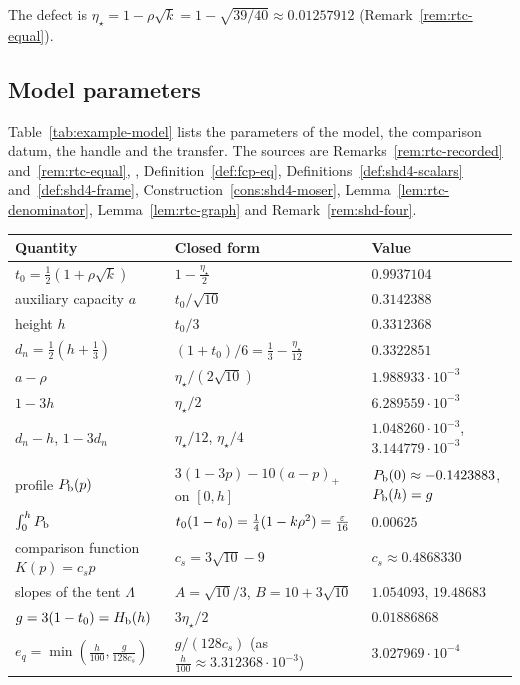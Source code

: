 The defect is $\eta_\star=1-\rho\sqrt k=1-\sqrt{39/40}\approx0.01257912$ (Remark~\ref{rem:rtc-equal}).

\subsection{Model parameters}

Table~\ref{tab:example-model} lists the parameters of the model, the comparison datum, the handle and the transfer. The
sources are Remarks~\ref{rem:rtc-recorded} and~\ref{rem:rtc-equal}, , Definition~\ref{def:fcp-eq},
Definitions~\ref{def:shd4-scalars} and~\ref{def:shd4-frame}, Construction~\ref{cons:shd4-moser},
Lemma~\ref{lem:rtc-denominator}, Lemma~\ref{lem:rtc-graph} and Remark~\ref{rem:shd-four}.

\begin{table}[ht]
\centering\footnotesize
\renewcommand{\arraystretch}{1.15}
\begin{tabular}{@{}p{}p{}p{}@{}}
\toprule
Quantity & Closed form & Value\\
\midrule
$t_0=\frac12(1+\rho\sqrt k)$ & $1-\frac{\eta_\star}2$ & $0.9937104$\\
auxiliary capacity $a$ & $t_0/\sqrt{10}$ & $0.3142388$\\
height $h$ & $t_0/3$ & $0.3312368$\\
$d_n=\frac12(h+\frac13)$ & $(1+t_0)/6=\frac13-\frac{\eta_\star}{12}$ & $0.3322851$\\
$a-\rho$ & $\eta_\star/(2\sqrt{10})$ & $1.988933\cdot10^{-3}$\\
$1-3h$ & $\eta_\star/2$ & $6.289559\cdot10^{-3}$\\
$d_n-h$, $1-3d_n$ & $\eta_\star/12$, $\eta_\star/4$ & $1.048260\cdot10^{-3}$, $3.144779\cdot10^{-3}$\\
\midrule
profile $P_{\mathrm b}(p)$ & $3(1-3p)-10(a-p)_+$ on $[0,h]$ & $P_{\mathrm b}(0)\approx-0.1423883$, $P_{\mathrm b}(h)=g$\\
$\int_0^hP_{\mathrm b}$ & $t_0(1-t_0)=\frac14(1-k\rho^2)=\frac{\varepsilon}{16}$ & $0.00625$\\
comparison function $K(p)=c_sp$ & $c_s=3\sqrt{10}-9$ & $c_s\approx0.4868330$\\
slopes of the tent $\Lambda$ & $A=\sqrt{10}/3$, $B=10+3\sqrt{10}$ & $1.054093$, $19.48683$\\
$g=3(1-t_0)=H_{\mathrm b}(h)$ & $3\eta_\star/2$ & $0.01886868$\\
$e_q=\min(\frac h{100},\frac g{128c_s})$ & $g/(128c_s)$ (as $\frac h{100}\approx3.312368\cdot10^{-3}$) & $3.027969\cdot10^{-4}$\\

\end{tabular}
\end{table}
